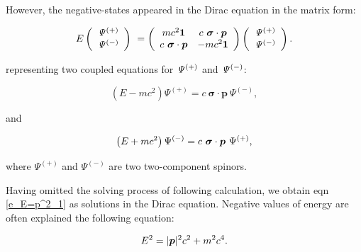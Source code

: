 \documentclass[%
 reprint,
 amsmath,amssymb,
 aps,
]{revtex4-1}
\numberwithin{equation}{section}%
\begin{document}
    However, the negative-states appeared in the Dirac equation in the matrix form:
    
        \begin{align}
            E
            \left( 
                \begin{array}{c}
                    \it\Psi^{(+)} \\ \it\Psi^{(-)}
                \end{array}
            \right) \
            =
            \left(
                \begin{array}{cc}
                    m c^2 \bm{1} 
                        & c \ \bm{\sigma} \cdot \bm{p} \\
                    c \ \bm{\sigma} \cdot \bm{p}
                        & - m c^2 \bm{1} \end{array}
            \right)
            \left(
                \begin{array}{c}
                    \it\Psi^{(+)} \\ \it\Psi^{(-)}
                \end{array}
            \right)
            \label{e_matrix_1}
            .
        \end{align}

    representing two coupled equations for $\it \Psi^{(+)}$ and $\it \Psi^{(-)}$:
    
    \begin{equation}
        \left( E - m c^{2} \right) \Psi^{(+)}
        = c \ \bm{\sigma} \cdot \bm{p} \ \Psi^{(-)}
        ,
    \end{equation}
    
    \noindent
    and

    \begin{equation}
        \left( E + m c^{2} \right) \Psi^{(-)}
        = c \ \bm{\sigma} \cdot \bm{p} \ \Psi^{(+)} \\
        ,
    \end{equation}

    \noindent
    where $\Psi^{(+)}$ and $\Psi^{(-)}$ are two two-component spinors.
    
    Having omitted the solving process of following calculation, we obtain eqn \ref{e_E=p^2_1} as solutions in the Dirac equation. Negative values of energy are often explained the following equation:


        \begin{equation}
            E^{2} = |\bm{p}|^{2} c^{2} + m^{2} c^{4}
            \label{e_E=p^2_1}
            \\.
        \end{equation}
\end{document}
